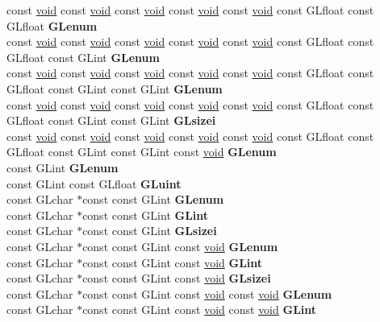 \begin{DoxyCompactItemize}
\begin{tabbing}
\>const \hyperlink{interfacevoid}{void} const \hyperlink{interfacevoid}{void} const \hyperlink{interfacevoid}{void} const \hyperlink{interfacevoid}{void} const \hyperlink{interfacevoid}{void} const GLfloat const GLfloat {\bfseries GLenum}\\
\>const \hyperlink{interfacevoid}{void} const \hyperlink{interfacevoid}{void} const \hyperlink{interfacevoid}{void} const \hyperlink{interfacevoid}{void} const \hyperlink{interfacevoid}{void} const GLfloat const GLfloat const GLint {\bfseries GLenum}\\
\>const \hyperlink{interfacevoid}{void} const \hyperlink{interfacevoid}{void} const \hyperlink{interfacevoid}{void} const \hyperlink{interfacevoid}{void} const \hyperlink{interfacevoid}{void} const GLfloat const GLfloat const GLint const GLint {\bfseries GLenum}\\
\>const \hyperlink{interfacevoid}{void} const \hyperlink{interfacevoid}{void} const \hyperlink{interfacevoid}{void} const \hyperlink{interfacevoid}{void} const \hyperlink{interfacevoid}{void} const GLfloat const GLfloat const GLint const GLint {\bfseries GLsizei}\\
\>const \hyperlink{interfacevoid}{void} const \hyperlink{interfacevoid}{void} const \hyperlink{interfacevoid}{void} const \hyperlink{interfacevoid}{void} const \hyperlink{interfacevoid}{void} const GLfloat const GLfloat const GLint const GLint const \hyperlink{interfacevoid}{void} {\bfseries GLenum}\\
\>const GLint {\bfseries GLenum}\\
\>const GLint const GLfloat {\bfseries GLuint}\\
\>const GLchar $\ast$const const GLint {\bfseries GLenum}\\
\>const GLchar $\ast$const const GLint {\bfseries GLint}\\
\>const GLchar $\ast$const const GLint {\bfseries GLsizei}\\
\>const GLchar $\ast$const const GLint const \hyperlink{interfacevoid}{void} {\bfseries GLenum}\\
\>const GLchar $\ast$const const GLint const \hyperlink{interfacevoid}{void} {\bfseries GLint}\\
\>const GLchar $\ast$const const GLint const \hyperlink{interfacevoid}{void} {\bfseries GLsizei}\\
\>const GLchar $\ast$const const GLint const \hyperlink{interfacevoid}{void} const \hyperlink{interfacevoid}{void} {\bfseries GLenum}\\
\>const GLchar $\ast$const const GLint const \hyperlink{interfacevoid}{void} const \hyperlink{interfacevoid}{void} {\bfseries GLint}\\

\end{tabbing}
\end{DoxyCompactItemize}
